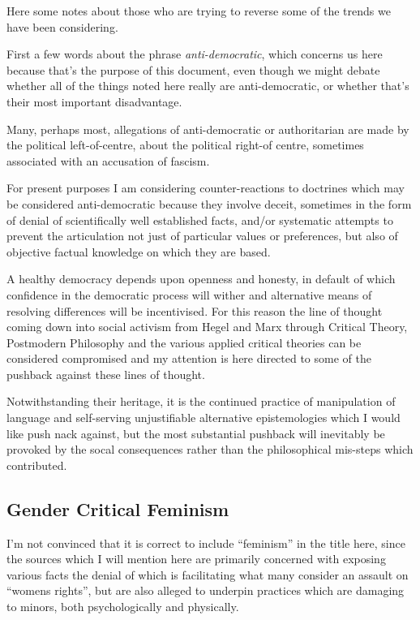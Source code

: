 \documentclass[10pt,titlepage]{book}
\begin{document}
Here some notes about those who are trying to reverse some of the  trends we have been considering.

First a few words about the phrase \emph{anti-democratic}, which concerns us here because that's the purpose of this document, even though we might debate whether all of the things noted here really are anti-democratic, or whether that's their most important disadvantage.

Many, perhaps most, allegations of anti-democratic or authoritarian are made by the political left-of-centre, about the political right-of centre, sometimes associated with an accusation of fascism.

For present purposes I am considering counter-reactions to doctrines which may be considered anti-democratic because they involve deceit, sometimes in the form of denial of scientifically well established facts, and/or systematic attempts to prevent the articulation not just of particular values or preferences, but also of objective factual knowledge on which they are based.

A healthy democracy depends upon openness and honesty, in default of which confidence in the democratic process will wither and alternative means of resolving differences will be incentivised.
For this reason the line of thought coming down into social activism from Hegel and Marx through Critical Theory, Postmodern Philosophy and the various applied critical theories can be considered compromised and my attention is here directed to some of the pushback against these lines of thought.

Notwithstanding their heritage, it is the continued practice of manipulation of language and self-serving unjustifiable alternative epistemologies which I would like push nack against, but the most substantial pushback will inevitably be provoked by the socal consequences rather than the philosophical mis-steps which contributed.

\subsection{Gender Critical Feminism}

I'm not convinced that it is correct to include ``feminism'' in the title here, since the sources which I will mention here are primarily concerned with exposing various facts the denial of which is facilitating what many consider an assault on ``womens rights'', but are also alleged to underpin practices which are damaging to minors, both psychologically and physically.
\end{document}

